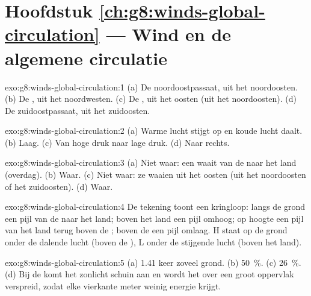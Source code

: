 \section*{Hoofdstuk \ref{ch:g8:winds-global-circulation} --- Wind en de algemene circulatie}

\begin{solution}{exo:g8:winds-global-circulation:1}
(a) De noordoostpassaat, uit het noordoosten. (b) De , uit het
noordwesten. (c) De , uit het oosten (uit het
noordoosten). (d) De zuidoostpassaat, uit het zuidoosten.
\end{solution}

\begin{solution}{exo:g8:winds-global-circulation:2}
(a) Warme lucht stijgt op en koude lucht daalt. (b) Laag. (c) Van hoge druk
naar lage druk. (d) Naar rechts.
\end{solution}

\begin{solution}{exo:g8:winds-global-circulation:3}
(a) Niet waar: een  waait van de  naar het land (overdag).
(b) Waar. (c) Niet waar: ze waaien uit het oosten (uit het noordoosten of
het zuidoosten). (d) Waar.
\end{solution}

\begin{solution}{exo:g8:winds-global-circulation:4}
De tekening toont een kringloop: langs de grond een pijl van de  naar het
land; boven het land een pijl omhoog; op hoogte een pijl van het land terug
boven de ; boven de  een pijl omlaag. H staat op de grond onder de
dalende lucht (boven de ), L onder de stijgende lucht (boven het land).
\end{solution}

\begin{solution}{exo:g8:winds-global-circulation:5}
(a) 1.41 keer zoveel grond. (b) 50~\%. (c) 26~\%. (d) Bij de  komt het
zonlicht schuin aan en wordt het over een groot oppervlak verspreid, zodat
elke vierkante meter weinig energie krijgt.
\end{solution}

